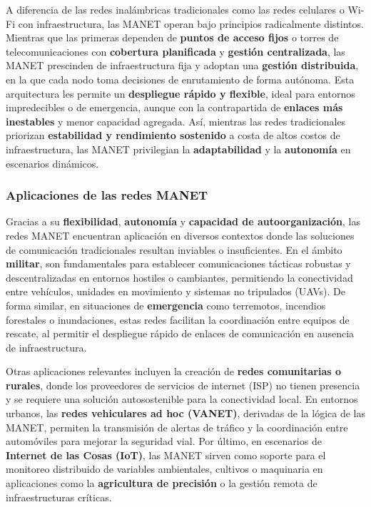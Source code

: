 \documentclass{article}
\begin{document}
A diferencia de las redes inalámbricas tradicionales como las redes celulares o Wi-Fi con infraestructura, las MANET operan bajo principios radicalmente distintos. Mientras que las primeras dependen de \textbf{puntos de acceso fijos} o torres de telecomunicaciones con \textbf{cobertura planificada} y \textbf{gestión centralizada}, las MANET prescinden de infraestructura fija y adoptan una \textbf{gestión distribuida}, en la que cada nodo toma decisiones de enrutamiento de forma autónoma. Esta arquitectura les permite un \textbf{despliegue rápido y flexible}, ideal para entornos impredecibles o de emergencia, aunque con la contrapartida de \textbf{enlaces más inestables} y menor capacidad agregada. Así, mientras las redes tradicionales priorizan \textbf{estabilidad y rendimiento sostenido} a costa de altos costos de infraestructura, las MANET privilegian la \textbf{adaptabilidad} y la \textbf{autonomía} en escenarios dinámicos.



\subsubsection{Aplicaciones de las redes MANET}
Gracias a su \textbf{flexibilidad}, \textbf{autonomía} y \textbf{capacidad de autoorganización}, las redes MANET encuentran aplicación en diversos contextos donde las soluciones de comunicación tradicionales resultan inviables o insuficientes. En el ámbito \textbf{militar}, son fundamentales para establecer comunicaciones tácticas robustas y descentralizadas en entornos hostiles o cambiantes, permitiendo la conectividad entre vehículos, unidades en movimiento y sistemas no tripulados (UAVs). De forma similar, en situaciones de \textbf{emergencia} como terremotos, incendios forestales o inundaciones, estas redes facilitan la coordinación entre equipos de rescate, al permitir el despliegue rápido de enlaces de comunicación en ausencia de infraestructura.

Otras aplicaciones relevantes incluyen la creación de \textbf{redes comunitarias o rurales}, donde los proveedores de servicios de internet (ISP) no tienen presencia y se requiere una solución autosostenible para la conectividad local. En entornos urbanos, las \textbf{redes vehiculares ad hoc (VANET)}, derivadas de la lógica de las MANET, permiten la transmisión de alertas de tráfico y la coordinación entre automóviles para mejorar la seguridad vial. Por último, en escenarios de \textbf{Internet de las Cosas (IoT)}, las MANET sirven como soporte para el monitoreo distribuido de variables ambientales, cultivos o maquinaria en aplicaciones como la \textbf{agricultura de precisión} o la gestión remota de infraestructuras críticas.
\end{document}
